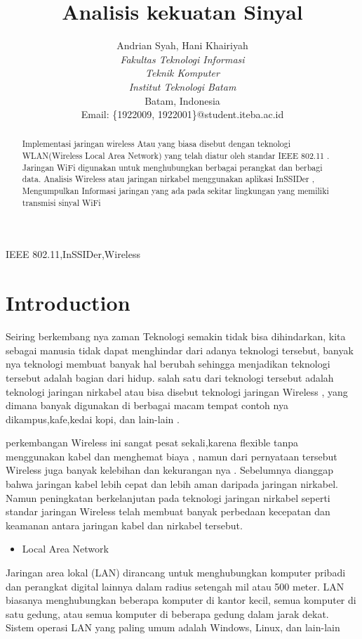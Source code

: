 \documentclass[conference]{IEEEtran}
\title{Analisis kekuatan Sinyal}
\author{Andrian Syah\IEEEauthorrefmark{1}, Hani Khairiyah\IEEEauthorrefmark{2}\\
\textit{Fakultas Teknologi Informasi}\\
\textit{Teknik Komputer}\\
\textit{Institut Teknologi Batam}\\
Batam, Indonesia\\
Email: \{\IEEEauthorrefmark{1}1922009, \IEEEauthorrefmark{2}1922001\}@student.iteba.ac.id}
\begin{document}
\maketitle

\begin{abstract}
    Implementasi jaringan wireless Atau yang biasa disebut dengan teknologi WLAN(Wireless Local Area Network) yang telah diatur oleh standar
    IEEE 802.11 . Jaringan WiFi digunakan untuk menghubungkan berbagai perangkat dan berbagi data.
    Analisis Wireless atau jaringan nirkabel menggunakan aplikasi InSSIDer ,
    Mengumpulkan Informasi jaringan yang ada pada sekitar lingkungan yang memiliki transmisi sinyal WiFi
\end{abstract}

\begin{IEEEkeywords}
    IEEE 802.11,InSSIDer,Wireless
\end{IEEEkeywords}

\section{Introduction}
Seiring berkembang nya zaman Teknologi semakin tidak bisa dihindarkan, 
kita sebagai manusia tidak dapat menghindar dari adanya teknologi tersebut,
banyak nya teknologi membuat banyak hal berubah sehingga menjadikan teknologi tersebut 
adalah bagian dari hidup. salah satu dari teknologi tersebut adalah teknologi jaringan nirkabel atau bisa disebut teknologi jaringan Wireless , yang dimana banyak digunakan di berbagai macam tempat  contoh nya dikampus,kafe,kedai kopi, dan lain-lain .

perkembangan Wireless ini sangat pesat sekali,karena flexible tanpa menggunakan kabel dan menghemat biaya 
, namun dari pernyataan tersebut Wireless juga banyak kelebihan dan kekurangan nya . 
Sebelumnya dianggap bahwa jaringan kabel lebih cepat dan lebih aman daripada jaringan nirkabel.
Namun peningkatan berkelanjutan pada teknologi jaringan nirkabel seperti standar jaringan Wireless
 telah membuat banyak perbedaan kecepatan dan keamanan antara jaringan kabel dan nirkabel tersebut.

 \begin{itemize}
    \item Local Area Network
\end{itemize}

Jaringan area lokal (LAN) dirancang untuk menghubungkan komputer pribadi dan perangkat digital lainnya dalam radius setengah mil atau 500 meter. 
LAN biasanya menghubungkan beberapa komputer di kantor kecil, semua komputer di satu gedung, atau semua komputer di beberapa gedung dalam jarak dekat.
Sistem operasi LAN yang paling umum adalah Windows, Linux, dan lain-lain
\end{document}
